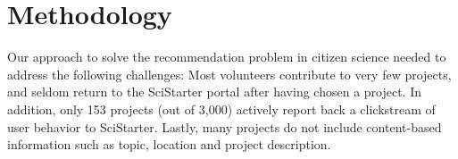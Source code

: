 \documentclass[letterpaper]{article} %
\begin{document}



\section{Methodology}



 Our approach to solve the recommendation problem in citizen science needed to address the following
 challenges: Most volunteers contribute to very few projects, and seldom return to the SciStarter portal
 after having chosen a project. In addition, only 153 projects (out of 3,000) actively report back a clickstream
 of user behavior to SciStarter. Lastly, many projects do not include content-based information such as topic, location and project description.
\end{document}
